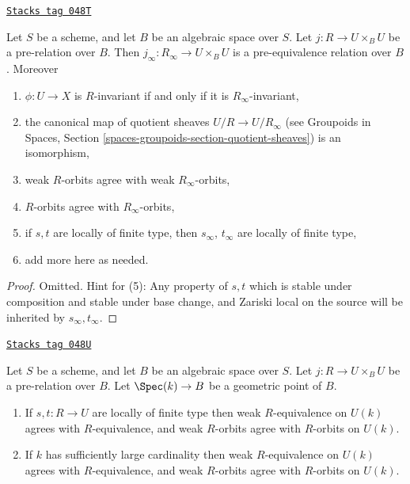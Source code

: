 \begin{lemma}
\label{groupoids-quotients-lemma-make-pre-equivalence}
\href{https://stacks.math.columbia.edu/tag/048T}{\texttt{Stacks tag 048T}}

Let $S$ be a scheme, and let $B$ be an algebraic space over $S$.
Let $j : R \to U \times_B U$ be a pre-relation over $B$.
Then $j_\infty : R_\infty \to U \times_B U$ is a
pre-equivalence relation over $B$. Moreover
\begin{enumerate}
\item $\phi : U \to X$ is $R$-invariant if and only if it is
$R_\infty$-invariant,
\item the canonical map of quotient sheaves $U/R \to U/R_\infty$ (see
Groupoids in Spaces, Section \ref{spaces-groupoids-section-quotient-sheaves})
is an isomorphism,
\item weak $R$-orbits agree with weak $R_\infty$-orbits,
\item $R$-orbits agree with $R_\infty$-orbits,
\item if $s, t$ are locally of finite type, then $s_\infty$, $t_\infty$
are locally of finite type,
\item add more here as needed.
\end{enumerate}
\end{lemma}

\begin{proof}
Omitted. Hint for (5): Any property of $s, t$ which is stable under composition
and stable under base change, and Zariski local on the source
will be inherited by $s_\infty, t_\infty$.
\end{proof}

\begin{lemma}
\label{groupoids-quotients-lemma-geometric-orbits}
\href{https://stacks.math.columbia.edu/tag/048U}{\texttt{Stacks tag 048U}}

Let $S$ be a scheme, and let $B$ be an algebraic space over $S$.
Let $j : R \to U \times_B U$ be a pre-relation over $B$.
Let $\Spec(k) \to B$ be a geometric point of $B$.
\begin{enumerate}
\item If $s, t : R \to U$ are locally of finite type
then weak $R$-equivalence on $U(k)$ agrees with $R$-equivalence, and
weak $R$-orbits agree with $R$-orbits on $U(k)$.
\item If $k$ has sufficiently large cardinality then weak $R$-equivalence
on $U(k)$ agrees with $R$-equivalence, and weak $R$-orbits agree
with $R$-orbits on $U(k)$.
\end{enumerate}
\end{lemma}

